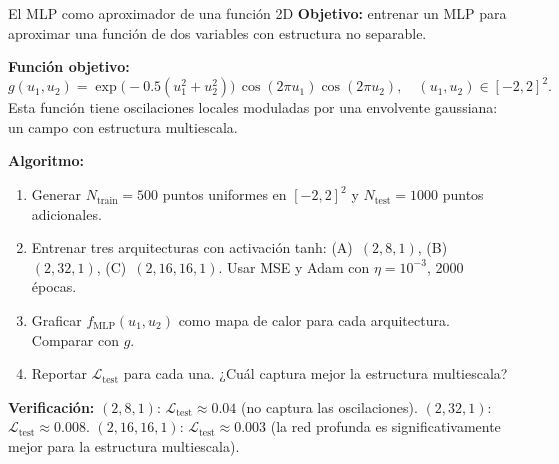 \begin{ejerciciocomp}{El MLP como aproximador de una función 2D}
\label{ejcomp:mlp_2d}
\textbf{Objetivo:} entrenar un MLP para aproximar una función de dos
variables con estructura no separable.

\medskip\noindent\textbf{Función objetivo:}
\begin{equation}
  g(u_1, u_2) = \exp\!\bigl(-0.5(u_1^2+u_2^2)\bigr)\,
  \cos(2\pi u_1)\cos(2\pi u_2),
  \quad (u_1,u_2) \in [-2,2]^2.
  \label{eq:funcion_2d}
\end{equation}
Esta función tiene oscilaciones locales moduladas por una envolvente
gaussiana: un campo con estructura multiescala.

\medskip\noindent\textbf{Algoritmo:}
\begin{enumerate}
  \item Generar $N_{\text{train}} = 500$ puntos uniformes en $[-2,2]^2$
        y $N_{\text{test}} = 1000$ puntos adicionales.
  \item Entrenar tres arquitecturas con activación tanh:
        (A)~$(2, 8, 1)$, (B)~$(2, 32, 1)$, (C)~$(2, 16, 16, 1)$.
        Usar MSE y Adam con $\eta = 10^{-3}$, 2000 épocas.
  \item Graficar $f_{\text{MLP}}(u_1, u_2)$ como mapa de calor para
        cada arquitectura. Comparar con $g$.
  \item Reportar $\mathcal{L}_{\text{test}}$ para cada una. ¿Cuál
        captura mejor la estructura multiescala?
\end{enumerate}

\medskip\noindent\textbf{Verificación:}
$(2, 8, 1)$: $\mathcal{L}_{\text{test}} \approx 0.04$ (no captura las
oscilaciones).
$(2, 32, 1)$: $\mathcal{L}_{\text{test}} \approx 0.008$.
$(2, 16, 16, 1)$: $\mathcal{L}_{\text{test}} \approx 0.003$ (la red
profunda es significativamente mejor para la estructura multiescala).
\end{ejerciciocomp}

